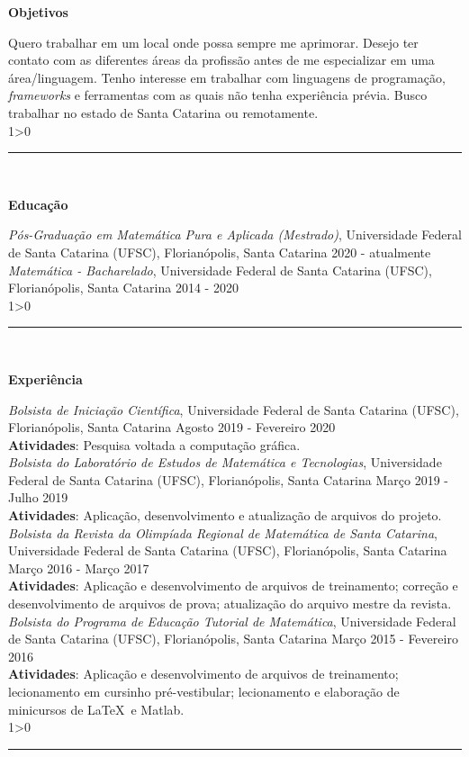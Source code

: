\documentclass[a4paper,10pt]{article}
\newcommand{\criaSecao}[4][0]{
    \noindent
	\begin{minipage}{0.16\linewidth}
		\large{\textbf{#2}}
		\vspace{#3\baselineskip}
	\end{minipage}
	\hfill
	\begin{minipage}{0.79\linewidth}
		#4
		\ifnum0#1>0 { \hrule {\ } } \fi
	\end{minipage}
	\vspace{\baselineskip}
}
\begin{document}
	\vspace{\baselineskip}
	
    \criaSecao[1]{Objetivos}{3}{
        Quero trabalhar em um local onde possa sempre me aprimorar. Desejo ter contato com as diferentes áreas da profissão antes de me especializar em uma área/linguagem. Tenho interesse em trabalhar com linguagens de programação, \textit{frameworks} e ferramentas com as quais não tenha experiência prévia. Busco trabalhar no estado de Santa Catarina ou remotamente. \\
    }
    
    \criaSecao[1]{Educação}{4}{
        \textit{Pós-Graduação em Matemática Pura e Aplicada (Mestrado)}, Universidade Federal de Santa Catarina (UFSC), Florianópolis, Santa Catarina \hfill 2020 - atualmente \\
		
		\textit{Matemática - Bacharelado}, Universidade Federal de Santa Catarina (UFSC), Florianópolis, Santa Catarina \hfill 2014 - 2020 \\
    }
    
    \criaSecao[1]{Experiência}{14}{
        \textit{Bolsista de Iniciação Científica}, Universidade Federal de Santa Catarina (UFSC), Florianópolis, Santa Catarina \hfill Agosto 2019 - Fevereiro 2020 \\
		\textbf{Atividades}: Pesquisa voltada a computação gráfica.\\
		
		\textit{Bolsista do Laboratório de Estudos de Matemática e Tecnologias}, Universidade Federal de Santa Catarina (UFSC), Florianópolis, Santa Catarina \hfill Março 2019 - Julho 2019 \\
		\textbf{Atividades}: Aplicação, desenvolvimento e atualização de arquivos do projeto.\\
		
		\textit{Bolsista da Revista da Olimpíada Regional de Matemática de Santa Catarina}, Universidade Federal de Santa Catarina (UFSC), Florianópolis, Santa Catarina \hfill Março 2016 - Março 2017 \\
		\textbf{Atividades}: Aplicação e desenvolvimento de arquivos de treinamento; correção e desenvolvimento de arquivos de prova; atualização do arquivo mestre da revista.\\
		
		\textit{Bolsista do Programa de Educação Tutorial de Matemática}, Universidade Federal de Santa Catarina (UFSC), Florianópolis, Santa Catarina \hfill Março 2015 - Fevereiro 2016 \\
		\textbf{Atividades}: Aplicação e desenvolvimento de arquivos de treinamento; lecionamento em cursinho pré-vestibular; lecionamento e elaboração de minicursos de \LaTeX\ e Matlab. \\
    }
    
\end{document}
